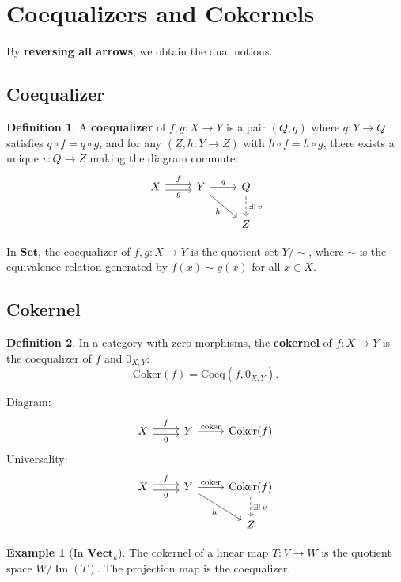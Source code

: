\documentclass{article}
\theoremstyle{definition}
\newtheorem{definition}{Definition}[section]
\newtheorem{example}{Example}[section]
\begin{document}
\section{Coequalizers and Cokernels}
By \textbf{reversing all arrows}, we obtain the dual notions.

\subsection{Coequalizer}
\begin{definition}
A \textbf{coequalizer} of $f, g : X \to Y$ is a pair $(Q, q)$ where $q : Y \to Q$ satisfies $q \circ f = q \circ g$, and for any $(Z, h : Y \to Z)$ with $h \circ f = h \circ g$, there exists a unique $v : Q \to Z$ making the diagram commute:
\[
\begin{tikzcd}
X \arrow[r, shift left, "f"] \arrow[r, shift right, "g"'] & Y \arrow[r, "q"] \arrow[dr, "h"'] & Q \arrow[d, dashed, "\exists!\, v"] \\
& & Z
\end{tikzcd}
\]
\end{definition}

In $\mathbf{Set}$, the coequalizer of $f, g : X \to Y$ is the quotient set $Y/{\sim}$, where $\sim$ is the equivalence relation generated by $f(x) \sim g(x)$ for all $x \in X$.

\subsection{Cokernel}
\begin{definition}
In a category with zero morphisms, the \textbf{cokernel} of $f : X \to Y$ is the coequalizer of $f$ and $0_{X,Y}$:
\[
\mathrm{Coker}(f) = \mathrm{Coeq}(f, 0_{X,Y}).
\]
\end{definition}

Diagram:
\[
\begin{tikzcd}
X \arrow[r, shift left, "f"] \arrow[r, shift right, "0"'] & Y \arrow[r, "\mathrm{coker}"] & \mathrm{Coker}(f)
\end{tikzcd}
\]
Universality:
\[
\begin{tikzcd}
X \arrow[r, shift left, "f"] \arrow[r, shift right, "0"'] & Y \arrow[r, "\mathrm{coker}"] \arrow[dr, "h"'] & \mathrm{Coker}(f) \arrow[d, dashed, "\exists!\, v"] \\
& & Z
\end{tikzcd}
\]

\begin{example}[In $\mathbf{Vect}_k$]
The cokernel of a linear map $T : V \to W$ is the quotient space $W / \operatorname{Im}(T)$. The projection map is the coequalizer.
\end{example}
\end{document}
